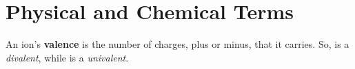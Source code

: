 
\chapter{Physical and Chemical Terms}
\label{chap:phys-chem-terms}

An ion's {\bf valence} is the number of charges, plus or minus, that
it carries. So,  is a {\it divalent}, while  is a {\it
  univalent}.


